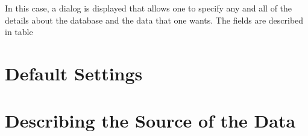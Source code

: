 \documentclass{article}
\begin{document}
In this case, a dialog is displayed that allows one to specify any and
all of the details about the database and the data that one wants.
The fields are described in table \




\section{Default Settings}

\section{Describing the Source of the Data}
\end{document}
